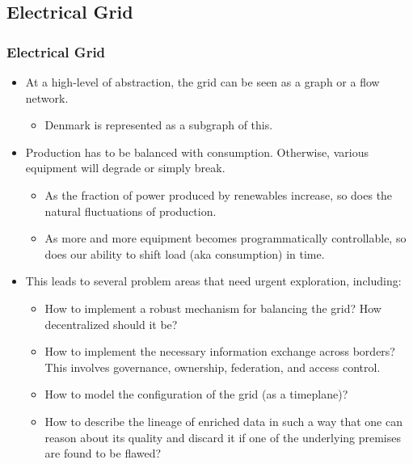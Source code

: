 \subsection{Electrical Grid}
\begin{frame}
  \frametitle{Electrical Grid}
  \vspace{1mm}
  \begin{itemize}
    \item At a high-level of abstraction, the grid can be seen as a graph or a flow network.
      \begin{itemize}
        \item Denmark is represented as a subgraph of this.
      \end{itemize}
    \item Production has to be balanced with consumption. Otherwise, various equipment will degrade or simply break.
      \begin{itemize}
        \item As the fraction of power produced by renewables increase, so does the natural fluctuations of production.
        \item As more and more equipment becomes programmatically controllable, so does our ability to shift load (aka consumption) in time.
      \end{itemize}
    \item This leads to several problem areas that need urgent exploration, including:
      \begin{itemize}
        \item How to implement a robust mechanism for balancing the grid? How decentralized should it be?
        \item How to implement the necessary information exchange across borders? This involves governance, ownership, federation, and access control.
        \item How to model the configuration of the grid (as a timeplane)?
        \item How to describe the lineage of enriched data in such a way that one can reason about its quality and discard it if one of the underlying premises are found to be flawed?
      \end{itemize}
  \end{itemize}
\end{frame}

